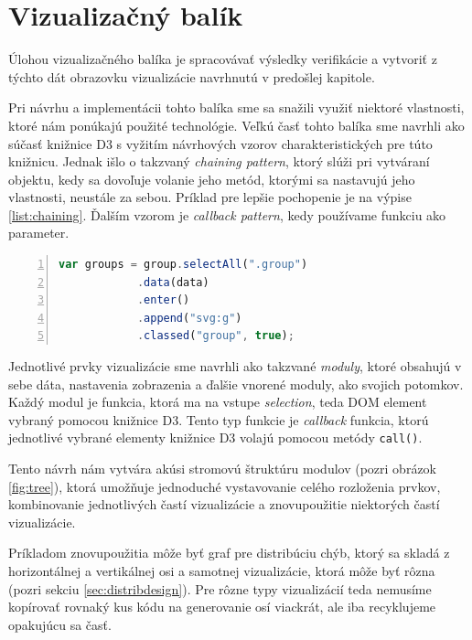 \section{Vizualizačný balík}
Úlohou vizualizačného balíka je spracovávať výsledky verifikácie a vytvoriť z týchto dát obrazovku vizualizácie navrhnutú v predošlej kapitole. 

Pri návrhu a implementácii tohto balíka sme sa snažili využiť niektoré vlastnosti, ktoré nám ponúkajú použité technológie. Veľkú časť tohto balíka sme navrhli ako súčasť knižnice D3 s vyžitím návrhových vzorov charakteristických pre túto knižnicu. Jednak išlo o takzvaný \textit{chaining pattern}, ktorý slúži pri vytváraní objektu, kedy sa dovoľuje volanie jeho metód, ktorými sa nastavujú jeho vlastnosti, neustále za sebou. Príklad pre lepšie pochopenie je na výpise \ref{list:chaining}.
Ďalším vzorom je \textit{callback pattern}, kedy používame funkciu ako parameter. 


\begin{lstlisting}[frame=solid, backgroundcolor=\color{bg}, basicstyle=\footnotesize\ttfamily, language=JavaScript, numbers=left, numberstyle=\tiny\color{black}, caption=Ukážka aplikácie návrhového vzoru \textit{chainning}., captionpos=b, label=list:chaining]
var groups = group.selectAll(".group")
		    .data(data)
		    .enter()
		    .append("svg:g")
		    .classed("group", true);	
\end{lstlisting}

Jednotlivé prvky vizualizácie sme navrhli ako takzvané \textit{moduly}, ktoré obsahujú v sebe dáta, nastavenia zobrazenia a ďalšie vnorené moduly, ako svojich potomkov. Každý modul je funkcia, ktorá ma na vstupe \textit{selection}, teda DOM element vybraný pomocou knižnice D3. Tento typ funkcie je \textit{callback} funkcia, ktorú jednotlivé vybrané elementy knižnice D3 volajú pomocou metódy \texttt{call()}. 

Tento návrh nám vytvára akúsi stromovú štruktúru modulov (pozri obrázok \ref{fig:tree}), ktorá umožňuje jednoduché vystavovanie celého rozloženia prvkov, kombinovanie jednotlivých častí vizualizácie a znovupoužitie niektorých častí vizualizácie. 

Príkladom znovupoužitia môže byť graf pre distribúciu chýb, ktorý sa skladá z horizontálnej a vertikálnej osi a samotnej vizualizácie, ktorá môže byť rôzna (pozri sekciu \ref{sec:distribdesign}). Pre rôzne typy vizualizácií teda nemusíme kopírovať rovnaký kus kódu na generovanie osí viackrát, ale iba recyklujeme opakujúcu sa časť.   

